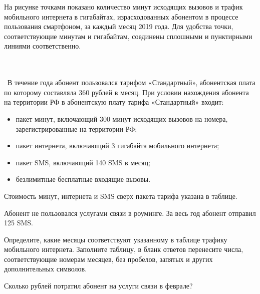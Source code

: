 \begin{class}[number=7]
	\begin{listofex}
		\item[] На рисунке точками показано количество минут исходящих вызовов и трафик мобильного интернета в гигабайтах, израсходованных абонентом в процессе пользования смартфоном, за каждый месяц 2019 года. Для удобства точки, соответствующие минутам и гигабайтам, соединены сплошными и пунктирными линиями соответственно.
		\\\ \begin{figure}[h]
		\end{figure}\\\
		В течение года абонент пользовался тарифом «Стандартный», абонентская плата по которому составляла 360 рублей в месяц. При условии нахождения абонента на территории РФ в абонентскую плату тарифа «Стандартный» входит:
		\begin{itemize}
			\item пакет минут, включающий 300 минут исходящих вызовов на номера, зарегистрированные на территории РФ;
			\item пакет интернета, включающий 3 гигабайта мобильного интернета;
			\item пакет SMS, включающий 140 SMS в месяц;
			\item безлимитные бесплатные входящие вызовы.
		\end{itemize}
		Стоимость минут, интернета и SMS сверх пакета тарифа указана в таблице.
		\newpage
		\begin{figure}[h]
		\end{figure}
		Абонент не пользовался услугами связи в роуминге. За весь год абонент отправил 125 SMS.
		\item Определите, какие месяцы соответствуют указанному в таблице трафику мобильного интернета. Заполните таблицу, в бланк ответов перенесите числа, соответствующие номерам месяцев, без пробелов, запятых и других дополнительных символов.
		\begin{figure}[h]
		\end{figure}
		\item Сколько рублей потратил абонент на услуги связи в феврале?
		

\end{listofex}
\end{class}

